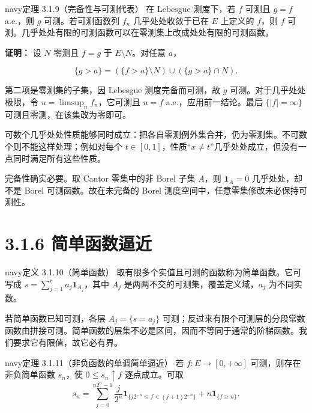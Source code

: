 \documentclass[11pt,a4paper]{article}
\begin{document}
\begin{sboxenv}{navy}{定理 3.1.9（完备性与可测代表）}
在 Lebesgue 测度下，若 \(f\) 可测且 \(g=f\) a.e.，则 \(g\)
可测。若可测函数列 \(f_n\) 几乎处处收敛于已在 \(E\) 上定义的 \(f\)，则
\(f\) 可测。几乎处处有限的可测函数可以在零测集上改成处处有限的可测函数。

\end{sboxenv}

\textbf{证明：} 设 \(N\) 零测且 \(f=g\) 于 \(E\setminus N\)。对任意
\(a\)，

\begin{equation*}
\{g>a\}=(\{f>a\}\setminus N)\cup(\{g>a\}\cap N).
\tag{3.1.7}
\end{equation*}

第二项是零测集的子集，因 Lebesgue 测度完备而可测，故 \(g\)
可测。对于几乎处处极限，令 \(u=\limsup_n f_n\)，它可测且 \(u=f\)
a.e.，应用前一结论。最后 \(\{|f|=\infty\}\)
可测且零测，在该集改为零即可。

可数个几乎处处性质能够同时成立：把各自零测例外集合并，仍为零测集。不可数个则不能这样处理；例如对每个
\(t\in[0,1]\)，性质``\(x\ne t\)''几乎处处成立，但没有一点同时满足所有这些性质。

完备性确实必要。取 Cantor 零集中的非 Borel 子集 \(A\)，则
\(\mathbf1_A=0\) 几乎处处，却不是 Borel 可测函数。故在未完备的 Borel
测度空间中，任意零集修改未必保持可测性。

\section[\S{}3.1.6
简单函数逼近]{3.1.6
简单函数逼近}\label{ux7b80ux5355ux51fdux6570ux903cux8fd1}

\begin{sboxenv}{navy}{定义 3.1.10（简单函数）}
取有限多个实值且可测的函数称为简单函数。它可写成
\(s=\sum_{j=1}^r a_j\mathbf1_{A_j}\)，其中 \(A_j\)
是两两不交的可测集，覆盖定义域，\(a_j\) 为不同实数。

\end{sboxenv}

若简单函数已知可测，各层 \(A_j=\{s=a_j\}\)
可测；反过来有限个可测层的分段常数函数由拼接可测。简单函数的层集不必是区间，因而不等同于通常的阶梯函数。我们要求它有限值，故它必有界。

\begin{sboxenv}{navy}{定理 3.1.11（非负函数的单调简单逼近）}
若 \(f:E\to[0,+\infty]\) 可测，则存在非负简单函数 \(s_n\)，使
\(0\le s_n\uparrow f\) 逐点成立。可取 \begin{equation*}
s_n=\sum_{j=0}^{n2^n-1}\frac{j}{2^n}
\mathbf1_{\{j2^{-n}\le f<(j+1)2^{-n}\}}
+n\mathbf1_{\{f\ge n\}}.
\tag{3.1.8}
\end{equation*}

\end{sboxenv}
\end{document}

